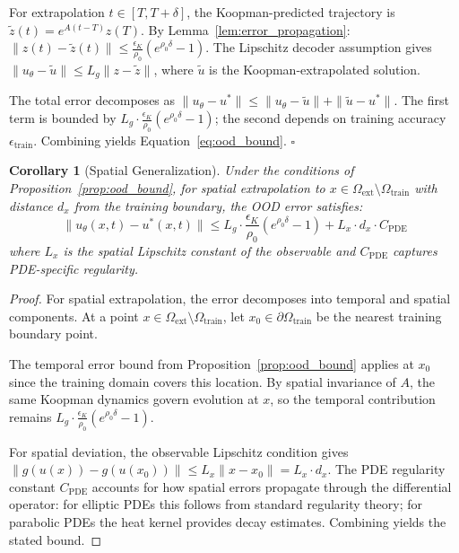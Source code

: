 \documentclass{article}
\newtheorem{corollary}{Corollary}
\theoremstyle{remark}
\begin{document}
For extrapolation $t \in [T, T+\delta]$, the Koopman-predicted trajectory is $\tilde{z}(t) = e^{A(t-T)}z(T)$. By Lemma~\ref{lem:error_propagation}:
$\|z(t) - \tilde{z}(t)\| \leq \frac{\epsilon_K}{\rho_0}(e^{\rho_0\delta} - 1)$.
The Lipschitz decoder assumption gives $\|u_\theta - \tilde{u}\| \leq L_g\|z - \tilde{z}\|$, where $\tilde{u}$ is the Koopman-extrapolated solution.

The total error decomposes as $\|u_\theta - u^*\| \leq \|u_\theta - \tilde{u}\| + \|\tilde{u} - u^*\|$. The first term is bounded by $L_g \cdot \frac{\epsilon_K}{\rho_0}(e^{\rho_0\delta} - 1)$; the second depends on training accuracy $\epsilon_{\text{train}}$. Combining yields Equation~\ref{eq:ood_bound}. $\square$

\begin{corollary}[Spatial Generalization]
\label{cor:spatial_ood}
Under the conditions of Proposition~\ref{prop:ood_bound}, for spatial extrapolation to $x \in \Omega_{\text{ext}} \setminus \Omega_{\text{train}}$ with distance $d_x$ from the training boundary, the OOD error satisfies:
\begin{equation}
\|u_\theta(x,t) - u^*(x,t)\| \leq L_g \cdot \frac{\epsilon_K}{\rho_0}(e^{\rho_0\delta} - 1) + L_x \cdot d_x \cdot C_{\text{PDE}}
\end{equation}
where $L_x$ is the spatial Lipschitz constant of the observable and $C_{\text{PDE}}$ captures PDE-specific regularity.
\end{corollary}

\begin{proof}
For spatial extrapolation, the error decomposes into temporal and spatial components. At a point $x \in \Omega_{\text{ext}} \setminus \Omega_{\text{train}}$, let $x_0 \in \partial\Omega_{\text{train}}$ be the nearest training boundary point.

The temporal error bound from Proposition~\ref{prop:ood_bound} applies at $x_0$ since the training domain covers this location. By spatial invariance of $A$, the same Koopman dynamics govern evolution at $x$, so the temporal contribution remains $L_g \cdot \frac{\epsilon_K}{\rho_0}(e^{\rho_0\delta} - 1)$.

For spatial deviation, the observable Lipschitz condition gives $\|g(u(x)) - g(u(x_0))\| \leq L_x\|x - x_0\| = L_x \cdot d_x$. The PDE regularity constant $C_{\text{PDE}}$ accounts for how spatial errors propagate through the differential operator: for elliptic PDEs this follows from standard regularity theory; for parabolic PDEs the heat kernel provides decay estimates. Combining yields the stated bound.
\end{proof}
\end{document}
